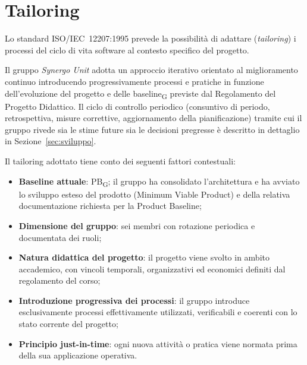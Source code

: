 
\section{Tailoring}
\label{sec:tailoring}

Lo standard ISO/IEC~12207:1995 prevede la possibilità di adattare
(\textit{tailoring}) i processi del ciclo di vita software al
contesto specifico del progetto.

Il gruppo \textit{Synergo Unit} adotta un approccio iterativo orientato al
miglioramento continuo introducendo progressivamente processi e
pratiche in funzione dell'evoluzione del progetto e delle baseline\textsubscript{G} previste
dal Regolamento del Progetto Didattico. Il ciclo di controllo periodico
(consuntivo di periodo, retrospettiva, misure correttive, aggiornamento
della pianificazione) tramite cui il gruppo rivede sia le stime future sia
le decisioni pregresse è descritto in dettaglio in Sezione~\ref{sec:sviluppo}.

Il tailoring adottato tiene conto dei seguenti fattori contestuali:

\begin{itemize}
    \item \textbf{Baseline attuale}: PB\textsubscript{G}; il gruppo ha
    consolidato l'architettura e ha avviato lo sviluppo esteso del prodotto
    (Minimum Viable Product) e della relativa documentazione richiesta per la Product Baseline;

    \item \textbf{Dimensione del gruppo}: sei membri con rotazione periodica e
    documentata dei ruoli;

    \item \textbf{Natura didattica del progetto}: il progetto viene svolto in ambito
    accademico, con vincoli temporali, organizzativi ed economici definiti dal
    regolamento del corso;

    \item \textbf{Introduzione progressiva dei processi}: il gruppo introduce
    esclusivamente processi effettivamente utilizzati, verificabili e coerenti
    con lo stato corrente del progetto;

    \item \textbf{Principio just-in-time}: ogni nuova attività o pratica viene normata
    prima della sua applicazione operativa.
\end{itemize}

